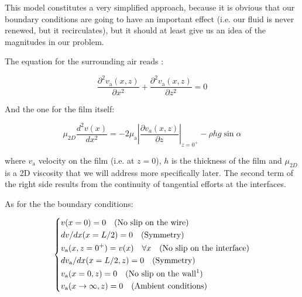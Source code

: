 This model constitutes a very simplified approach, because it is obvious that our boundary conditions are going to have an important effect (i.e. our fluid is never renewed, but it recirculates), but it should at least give us an idea of the magnitudes in our problem.

The equation for the surrounding air reads :

\begin{equation}
\frac{\partial^{2} v_{\mathrm{a}}(x, z)}{\partial x^{2}}+\frac{\partial^{2} v_{\mathrm{a}}(x, z)}{\partial z^{2}}=0
\label{air_velocity}
\end{equation}

And the one for the film itself:

\begin{equation}
\mu_{2D} \frac{d^{2} v(x)}{d x^{2}}=-2 \mu_{\mathrm{a}}\left|\frac{\partial v_{a}(x, z)}{\partial z}\right|_{z=0^{+}}-\rho h g \sin \alpha
\label{film_velocity}
\end{equation}

where $v_{\mathrm{a}}$ velocity on the film (i.e. at $z = 0$), $h$ is the thickness of the film and $\mu_{2D}$ is a 2D viscosity that we will address more specifically later. The second term of the right side results from the continuity of tangential efforts at the interfaces.

As for the the boundary conditions:

\begin{equation}
\left\{
\begin{aligned}
& v(x=0) = 0 \quad \text{(No slip on the wire)} \\
& dv/dx(x=L/2) = 0 \quad \text{(Symmetry)} \\
& v_{\mathrm{a}}(x,z=0^+) = v(x) \quad \forall x \quad \text{(No slip on the interface)}\\
& dv_{\mathrm{a}}/dx(x=L/2,z) = 0 \quad \text{(Symmetry)} \\
& v_{\mathrm{a}}(x=0,z) = 0 \quad \text{(No slip on the wall\protect\footnotemark)} \\
& v_{\mathrm{a}}(x \rightarrow \infty,z) = 0 \quad \text{(Ambient conditions)}
\end{aligned}
\right.
\end{equation}




